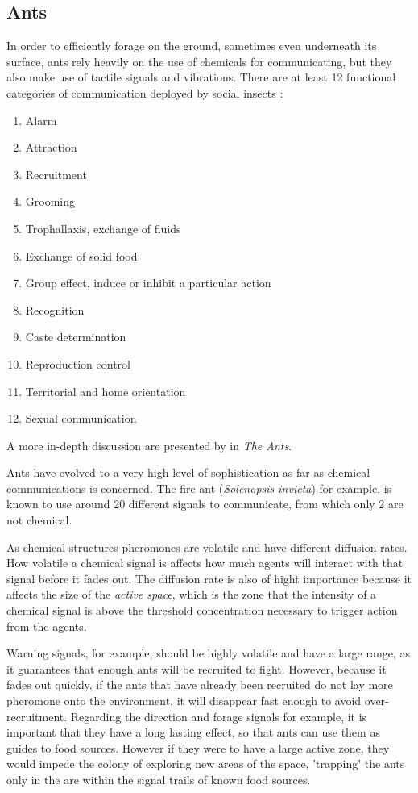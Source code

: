 \subsection{Ants}
\label{sec:com-ants}

In order to efficiently forage on the ground, sometimes even underneath its surface, ants rely heavily on the use of chemicals for communicating, but they also make use of tactile signals and vibrations. \cite{holldobler1999} There are at least 12 functional categories of communication deployed by social insects \cite{citeulike:3731267}:

\begin{enumerate}
  \item Alarm
  \item Attraction
  \item Recruitment
  \item Grooming
  \item Trophallaxis, exchange of fluids
  \item Exchange of solid food
  \item Group effect, induce or inhibit a particular action
  \item Recognition
  \item Caste determination
  \item Reproduction control
  \item Territorial and home orientation
  \item Sexual communication
\end{enumerate}

A more in-depth discussion are presented by \citeauthor{holldobler1990} in \emph{The Ants}.

Ants have evolved to a very high level of sophistication as far as chemical communications is concerned. The fire ant (\emph{Solenopsis invicta}) for example, is known to use around 20 different signals to communicate, from which only 2 are not chemical. \cite{citeulike:3731267} \cite{tschinkel2006fire}

As chemical structures pheromones are volatile and have different diffusion rates. How volatile a chemical signal is affects how much agents will interact with that signal before it fades out. The diffusion rate is also of hight importance because it affects the size of the \emph{active space}, which is the zone that the intensity of a chemical signal is above the threshold concentration necessary to trigger action from the agents. \cite{citeulike:3731267} 

Warning signals, for example, should be highly volatile and have a large range, as it guarantees that enough ants will be recruited to fight. However, because it fades out quickly, if the ants that have already been recruited do not lay more pheromone onto the environment, it will disappear fast enough to avoid over-recruitment. Regarding the direction and forage signals for example, it is important that they have a long lasting effect, so that ants can use them as guides to food sources. However if they were to have a large active zone, they would impede the colony of exploring new areas of the space, 'trapping' the ants only in the are within the signal trails of known food sources.

